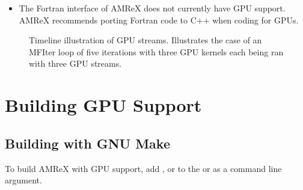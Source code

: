 \documentclass[letterpaper,10pt,english]{sphinxmanual}
\begin{document}
\begin{itemize}
\sphinxAtStartPar
The AMReX implementation of streams is illustrated in \hyperref[\detokenize{GPU:fig-gpu-streams}]{Fig.\@ \ref{\detokenize{GPU:fig-gpu-streams}}}.
The CPU runs the first iteration of the MFIter loop (blue), which contains three
GPU kernels.  The kernels begin immediately in GPU Stream 1 and run in the same
order they were added. The second (red) and third (green) iterations are similarly
launched in Streams 2 and 3. The fourth (orange) and fifth (purple) iterations
require more GPU resources than remain, so they have to wait until resources are
freed before beginning. Meanwhile, after all the loop iterations are launched, the
CPU reaches a synchronize in the MFIter’s destructor and waits for all GPU launches
to complete before continuing.

\item {} 
\sphinxAtStartPar
The Fortran interface of AMReX does not currently have GPU support.  AMReX recommends
porting Fortran code to C++ when coding for GPUs.

\end{itemize}

\begin{center}

\begin{figure}[htbp]
\centering
\capstart

\noindent{}
\caption{Timeline illustration of GPU streams. Illustrates the case of an
MFIter loop of five iterations with three GPU kernels each being
ran with three GPU streams.}\label{\detokenize{GPU:id2}}\label{\detokenize{GPU:fig-gpu-streams}}\end{figure}

\end{center}


\section{Building GPU Support}
\label{\detokenize{GPU:building-gpu-support}}\label{\detokenize{GPU:sec-gpu-build}}

\subsection{Building with GNU Make}
\label{\detokenize{GPU:building-with-gnu-make}}
\sphinxAtStartPar
To build AMReX with GPU support, add ,  or
 to the  or as a command line argument.
\end{document}

